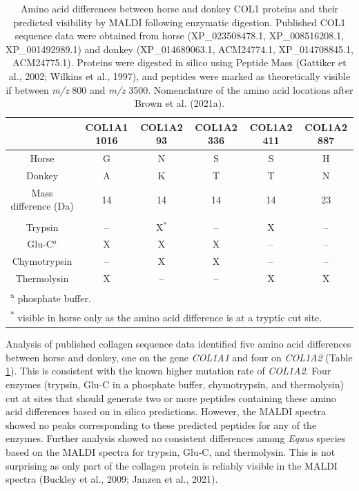 \documentclass[preprint, 3p, authoryear]{elsarticle} %
\begin{document}
\begin{table}

\caption{\label{tab:eqtable2}Amino acid differences between horse and donkey COL1 proteins and their predicted visibility by MALDI following enzymatic digestion. Published COL1 sequence data were obtained from horse (XP\_023508478.1, XP\_008516208.1, XP\_001492989.1) and donkey (XP\_014689063.1, ACM24774.1, XP\_014708845.1, ACM24775.1). Proteins were digested in silico using Peptide Mass (Gattiker et al., 2002; Wilkins et al., 1997), and peptides were marked as theoretically visible if between \emph{m/z} 800 and \emph{m/z} 3500. Nomenclature of the amino acid locations after Brown et al. (2021a).}
\centering
\begin{tabular}[t]{cccccc}
\toprule
  & COL1A1 1016 & COL1A2 93 & COL1A2 336 & COL1A2 411 & COL1A2 887\\
\midrule
Horse & G & N & S & S & H\\
Donkey & A & K & T & T & N\\
Mass difference (Da) & 14 & 14 & 14 & 14 & 23\\
\addlinespace[1em]
\multicolumn{6}{l}{\textbf{Predicted visibility by MALDI-TOF following enzymatic digestion}}\\
\hspace{1em}Trypsin & -- & X$^{*}$ & -- & X & --\\
\hspace{1em}Glu-C$^{a}$ & X & X & X & -- & --\\
\hspace{1em}Chymotrypsin & -- & X & X & -- & --\\
\hspace{1em}Thermolysin & X & -- & -- & X & X\\
\bottomrule
\multicolumn{6}{l}{\rule{0pt}{1em}\textsuperscript{a} phosphate buffer.}\\
\multicolumn{6}{l}{\rule{0pt}{1em}\textsuperscript{*} visible in horse only as the amino acid difference is at a tryptic cut site.}\\
\end{tabular}
\end{table}

Analysis of published collagen sequence data identified five amino acid differences between horse and donkey, one on the gene \emph{COL1A1} and four on \emph{COL1A2} (Table \ref{tab:eqtable2}). This is consistent with the known higher mutation rate of \emph{COL1A2}. Four enzymes (trypsin, Glu-C in a phosphate buffer, chymotrypsin, and thermolysin) cut at sites that should generate two or more peptides containing these amino acid differences based on in silico predictions. However, the MALDI spectra showed no peaks corresponding to these predicted peptides for any of the enzymes. Further analysis showed no consistent differences among \emph{Equus} species based on the MALDI spectra for trypsin, Glu-C, and thermolysin. This is not surprising as only part of the collagen protein is reliably visible in the MALDI spectra (Buckley et al., 2009; Janzen et al., 2021).
\end{document}

